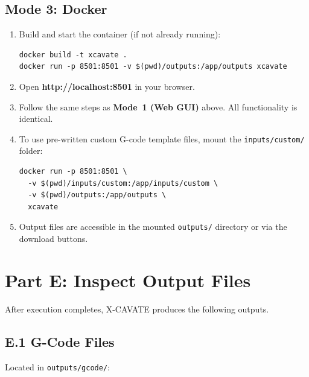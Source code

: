 \documentclass[11pt,letterpaper]{article}
\newcommand{\code}[1]{\texttt{#1}}
\begin{document}
\subsection{Mode 3: Docker}

\begin{enumerate}
    \item Build and start the container (if not already running):
    \begin{lstlisting}
docker build -t xcavate .
docker run -p 8501:8501 -v $(pwd)/outputs:/app/outputs xcavate
    \end{lstlisting}

    \item Open \textbf{http://localhost:8501} in your browser.

    \item Follow the same steps as \textbf{Mode~1 (Web GUI)} above. All functionality is identical.

    \item To use pre-written custom G-code template files, mount the \code{inputs/custom/} folder:
    \begin{lstlisting}
docker run -p 8501:8501 \
  -v $(pwd)/inputs/custom:/app/inputs/custom \
  -v $(pwd)/outputs:/app/outputs \
  xcavate
    \end{lstlisting}

    \item Output files are accessible in the mounted \code{outputs/} directory or via the download buttons.
\end{enumerate}


\section{Part E: Inspect Output Files}

After execution completes, X-CAVATE produces the following outputs.

\subsection{E.1 G-Code Files}

Located in \code{outputs/gcode/}:
\end{document}
